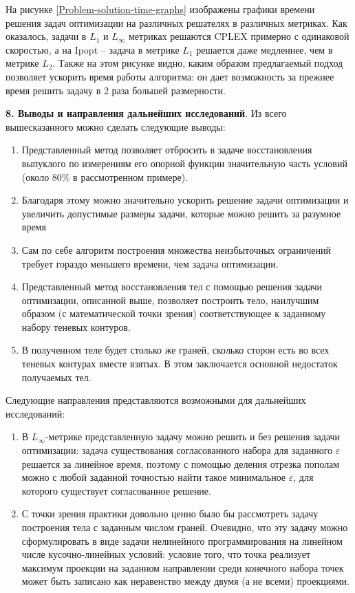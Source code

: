 \documentclass[a4paper, 10pt]{article}
\theoremstyle{definition}
\theoremstyle{plain}
\theoremstyle{plain}
\begin{document}
На рисунке \ref{Problem-solution-time-graphs} изображены графики времени решения
задач оптимизации на различных решателях в различных метриках. Как оказалось,
задачи в $L_{1}$ и $L_{\infty}$ метриках решаются CPLEX примерно с одинаковой
скоростью, а на Ipopt -- задача в метрике $L_{1}$ решается даже медленнее, чем
в метрике $L_{2}$. Также на этом рисунке видно, каким образом предлагаемый
подход позволяет ускорить время работы алгоритма: он дает возможность за прежнее
время решить задачу в 2 раза большей размерности.

\textbf{8. Выводы и направления дальнейших исследований}. Из всего
вышесказанного можно сделать следующие выводы:

\begin{enumerate}
 \item Представленный метод позволяет отбросить в задаче восстановления
 выпуклого по измерениям его опорной функции значительную часть условий
 (около 80\% в рассмотренном примере).
 \item Благодаря этому можно значительно ускорить решение задачи оптимизации и
 увеличить допустимые размеры задачи, которые можно решить за разумное время
 \item Сам по себе алгоритм построения множества неизбыточных ограничений
 требует гораздо меньшего времени, чем задача оптимизации.
 \item Представленный метод восстановления тел с помощью решения задачи
 оптимизации, описанной выше, позволяет построить тело, наилучшим образом
 (с математической точки зрения) соответствующее к заданному набору теневых
 контуров.
 \item В полученном теле будет столько же граней, сколько сторон есть во всех
 теневых контурах вместе взятых. В этом заключается основной недостаток
 получаемых тел.
\end{enumerate}

Следующие направления представляются возможными для дальнейших исследований:

\begin{enumerate}
 \item В $L_{\infty}$-метрике представленную задачу можно решить и без
 решения задачи оптимизации: задача существования согласованного набора для
 заданного $\varepsilon$ решается за линейное время, поэтому с помощью деления
 отрезка пополам можно с любой заданной точностью найти такое минимальное
 $\varepsilon$, для которого существует согласованное решение.
 \item С точки зрения практики довольно ценно было бы рассмотреть задачу
 построения тела с заданным числом граней. Очевидно, что эту задачу можно
 сформулировать в виде задачи нелинейного программирования на линейном числе
 кусочно-линейных условий: условие того, что точка реализует максимум проекции
 на заданном направлении среди конечного набора точек может быть записано как
 неравенство между двумя (а не всеми) проекциями.
\end{enumerate}





\end{document}
